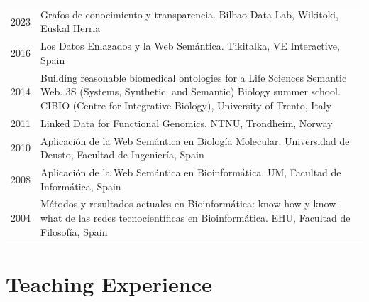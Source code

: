 \documentclass[11pt,fullpage]{article}
\begin{document}
\begin{longtable}{p{0.5in}|p{5.5in}}


2023 & Grafos de conocimiento y transparencia. Bilbao Data Lab, Wikitoki, Euskal Herria \\

2016 & Los Datos Enlazados y la Web Sem\'antica. Tikitalka, VE Interactive, Spain \\

2014 & Building reasonable biomedical ontologies for a Life Sciences Semantic Web. 3S (Systems, Synthetic, and Semantic) Biology summer school. CIBIO (Centre for Integrative Biology), University of Trento, Italy \\

2011 & Linked Data for Functional Genomics. NTNU, Trondheim, Norway \\

2010 & Aplicaci\'on de la Web Sem\'antica en Biolog\'ia Molecular. Universidad de Deusto, Facultad de Ingenier\'ia, Spain \\

2008 & Aplicaci\'on de la Web Sem\'antica en Bioinform\'atica. UM, Facultad de Inform\'atica, Spain \\

2004 & M\'etodos y resultados actuales en Bioinform\'atica: know-how y know-what de las redes tecnocient\'ificas en Bioinform\'atica. EHU, Facultad de Filosof\'ia, Spain

\end{longtable}




\section*{Teaching Experience}
\end{document}
